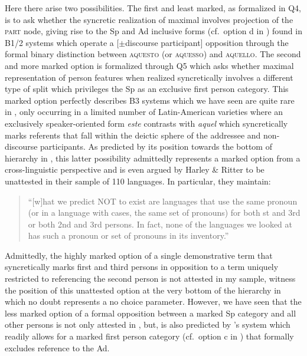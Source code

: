 \documentclass[output=paper]{langsci/langscibook}
\begin{document}
Here there arise two possibilities. The first and least marked, as formalized
in Q4, is to ask whether the syncretic realization of maximal 
involves projection of the \textsc{part} node, giving rise to the Sp and Ad
inclusive forms (cf.\ option d in ) found in
B1/2 systems which operate a [$\pm$discourse participant]
opposition through the formal binary distinction between \textsc{aquesto} (or
\textsc{aquesso}) and \textsc{aquello}. The second and more marked option is
formalized through Q5 which asks whether maximal representation of person
features when realized syncretically involves a different type of split which
privileges the Sp as an exclusive first person category. This marked option
perfectly describes B3 systems which we have seen are quite rare in ,
only occurring in a limited number of Latin-American  varieties where an
exclusively speaker-oriented form \emph{este} contrasts with \emph{aquel} which
syncretically marks referents that fall within the deictic sphere of the
addressee and non-discourse participants. As predicted by its position towards
the bottom of hierarchy in , this latter possibility
admittedly represents a marked option from a cross-linguistic perspective and
is even argued by Harley \& Ritter to be unattested in their sample of 110
languages. In particular, they maintain:

\begin{quotation}
    \enquote{[w]hat we predict NOT to exist are languages that use the same pronoun (or
    in a language with cases, the same set of pronouns) for both \First{}st and
    3rd or both 2nd and 3rd persons.  In fact, none of the languages we looked
    at has such a pronoun or set of pronouns in its
    inventory.} \parencite[513]{HarRit2002}
\end{quotation}

Admittedly, the highly marked option of a single demonstrative term that
syncretically marks first and third persons in opposition to a term uniquely
restricted to referencing the second person is not attested in my 
sample, witness the position of this unattested option at the very bottom of
the hierarchy in  which no doubt represents a no choice
parameter. However, we have seen that the less marked option of a formal
opposition between a marked Sp category and all other persons is not only
attested in , but, is also predicted by \citeauthor{HarRit2002}'s system
which readily allows for a marked first person category (cf.\ option c in
) that formally excludes reference to the Ad.
\end{document}

